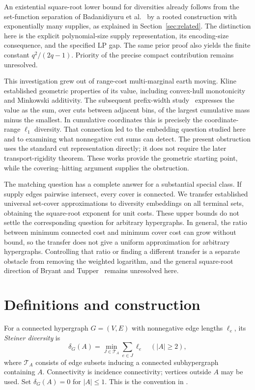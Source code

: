 \documentclass[11pt]{article}
\begin{document}
An existential square-root lower bound for diversities already follows
from the set-function separation of Badanidiyuru et al.~\cite{SVF} by a
rooted construction with exponentially many supplies, as explained in
Section~\ref{sec:related}. The distinction here is the explicit polynomial-size
supply representation, its encoding-size consequence, and the specified LP gap.
The same prior proof also yields the finite constant $q^2/(2q-1)$.
Priority of the precise compact contribution remains unresolved.

This investigation grew out of range-cost multi-marginal earth moving.
Kline~\cite{K19} established geometric properties of its value, including
convex-hull monotonicity and Minkowski additivity. The subsequent prefix-width
study~\cite{K26} expresses the value as the sum, over cuts between adjacent
bins, of the largest cumulative mass minus the smallest. In cumulative
coordinates this is precisely the coordinate-range $\ell_1$ diversity.
That connection led to the embedding question studied here and to examining
what nonnegative cut sums can detect. The present obstruction uses the
standard cut representation directly; it does not require the later
transport-rigidity theorem. These works provide the geometric starting
point, while the covering--hitting argument supplies the obstruction.

The matching question has a complete answer for a substantial special
class. If supply edges pairwise intersect, every cover is connected.
We transfer established universal set-cover approximations to diversity
embeddings on all terminal sets, obtaining the square-root exponent for
unit costs. These upper bounds do not settle the corresponding question
for arbitrary hypergraphs. In general, the ratio between minimum connected
cost and minimum cover cost can grow without bound, so the transfer does
not give a uniform approximation for arbitrary hypergraphs. Controlling
that ratio or finding a different transfer is a separate obstacle from
removing the weighted logarithm, and the general square-root direction
of Bryant and Tupper~\cite{BT17} remains unresolved here.


\section{Definitions and construction}
For a connected hypergraph $G=(V,E)$ with nonnegative edge lengths $\ell_e$,
its \emph{Steiner diversity} is
\[
 \delta_G(A)=\min_{J\in\mathcal T_A}\sum_{e\in J}\ell_e
 \quad (|A|\ge2),
\]
where $\mathcal T_A$ consists of edge subsets inducing a connected
subhypergraph containing $A$. Connectivity is incidence connectivity;
vertices outside $A$ may be used. Set $\delta_G(A)=0$ for $|A|\le1$.
This is the convention in \cite[Definition 1.6]{JS}.
\end{document}
